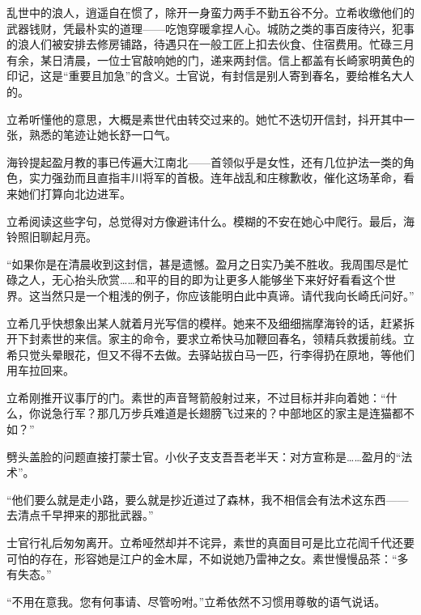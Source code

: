 \documentclass{article}
\begin{document}
乱世中的浪人，逍遥自在惯了，除开一身蛮力两手不勤五谷不分。立希收缴他们的武器钱财，凭最朴实的道理——吃饱穿暖拿捏人心。城防之类的事百废待兴，犯事的浪人们被安排去修房铺路，待遇只在一般工匠上扣去伙食、住宿费用。忙碌三月有余，某日清晨，一位士官敲响她的门，递来两封信。信上都盖有长崎家明黄色的印记，这是“重要且加急”的含义。士官说，有封信是别人寄到春名，要给椎名大人的。



立希听懂他的意思，大概是素世代由转交过来的。她忙不迭切开信封，抖开其中一张，熟悉的笔迹让她长舒一口气。



海铃提起盈月教的事已传遍大江南北——首领似乎是女性，还有几位护法一类的角色，实力强劲而且直指丰川将军的首极。连年战乱和庄稼歉收，催化这场革命，看来她们打算向北边进军。



立希阅读这些字句，总觉得对方像避讳什么。模糊的不安在她心中爬行。最后，海铃照旧聊起月亮。



“如果你是在清晨收到这封信，甚是遗憾。盈月之日实乃美不胜收。我周围尽是忙碌之人，无心抬头欣赏……和平的目的即为让更多人能够坐下来好好看看这个世界。这当然只是一个粗浅的例子，你应该能明白此中真谛。请代我向长崎氏问好。”



立希几乎快想象出某人就着月光写信的模样。她来不及细细揣摩海铃的话，赶紧拆开下封素世的来信。家主的命令，要求立希快马加鞭回春名，领精兵救援前线。立希只觉头晕眼花，但又不得不去做。去驿站拔白马一匹，行李得扔在原地，等他们用车拉回来。



立希刚推开议事厅的门。素世的声音弩箭般射过来，不过目标并非向着她：“什么，你说急行军？那几万步兵难道是长翅膀飞过来的？中部地区的家主是连猫都不如？”



劈头盖脸的问题直接打蒙士官。小伙子支支吾吾老半天：对方宣称是……盈月的“法术”。



“他们要么就是走小路，要么就是抄近道过了森林，我不相信会有法术这东西——去清点千早押来的那批武器。”



士官行礼后匆匆离开。立希哑然却并不诧异，素世的真面目可是比立花訚千代还要可怕的存在，形容她是江户的金木犀，不如说她乃雷神之女。素世慢慢品茶：“多有失态。”



“不用在意我。您有何事请、尽管吩咐。”立希依然不习惯用尊敬的语气说话。
\end{document}
